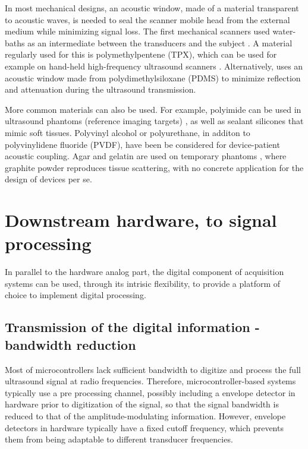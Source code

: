 \documentclass{article}
\begin{document}
In most mechanical designs, an acoustic window, made of a material transparent to acoustic waves, is needed to seal the scanner mobile head from the external medium while minimizing signal loss. The first mechanical scanners used water-baths as an intermediate between the transducers and the subject \cite{schueler_fundamentals_1984}. A material regularly used for this is polymethylpentene (TPX), which can be used for example on hand-held high-frequency ultrasound scanners \cite{erickson_hand-held_2001,brown_low_2013}.  Alternatively, \cite{qiu_ultrasound_2020} uses an acoustic window made from polydimethylsiloxane (PDMS) to minimize reflection and
attenuation during the ultrasound transmission.

More common materials can also be used. For example, polyimide can be used in ultrasound phantoms (reference imaging targets) \cite{xu_high-frequency_2008, lei_sun_high-frame_2008}, as well as sealant silicones \cite{lorenzo_experimental_2009} that mimic soft tissues. Polyvinyl alcohol or polyurethane, in additon to polyvinylidene fluoride (PVDF), have been be considered \cite{sikdar_novel_2014}  for device-patient acoustic coupling. Agar and gelatin are used on temporary phantoms \cite{vogt_development_2005,chun_ultrasound_2015}, where graphite powder reproduces tissue scattering, with no concrete application for the design of devices per se. 






\newpage
\section{Downstream hardware, to signal processing}

In parallel to the hardware analog part, the digital component of acquisition systems can be used, through its intrisic flexibility, to provide a platform of choice to implement digital processing. 

\subsection{Transmission of the digital information - bandwidth reduction}

Most of microcontrollers lack sufficient bandwidth to digitize and process the full ultrasound signal at radio frequencies. Therefore, microcontroller-based systems typically use a pre processing channel, possibly including a envelope detector in hardware prior to digitization of the signal, so that the signal bandwidth is reduced to that of the amplitude-modulating information. However, envelope detectors in hardware typically have a fixed cutoff frequency, which prevents them from being adaptable to different transducer frequencies.
\end{document}
